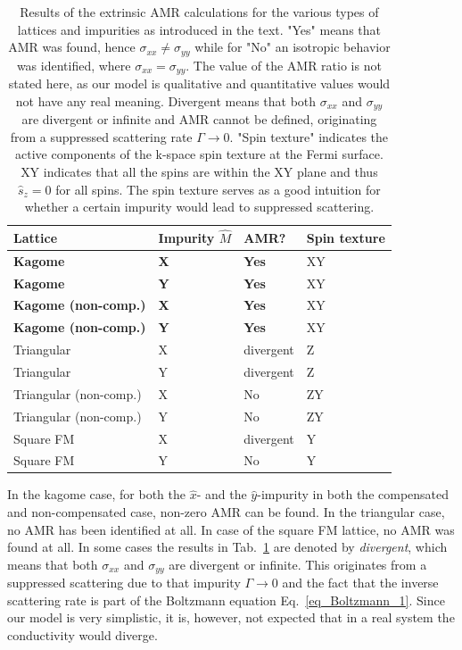 \documentclass[prb,showpacs,amsmath,amssymb,superscriptaddress,twocolumn,floatfix]{revtex4-1}
\begin{document}
\begin{table}
	\begin{tabular}{llll}
	Lattice & Impurity $\hat{M}$ & AMR? & Spin texture \\
	\hline 
	\textbf{Kagome} & \textbf{X} & \textbf{Yes} & XY\\
	\textbf{Kagome} & \textbf{Y} & \textbf{Yes} & XY \\
	\textbf{Kagome (non-comp.)} & \textbf{X} & \textbf{Yes} & XY\\
	\textbf{Kagome (non-comp.)} & \textbf{Y} & \textbf{Yes} & XY \\
	\hline 
	Triangular & X & divergent & Z \\
	Triangular & Y & divergent & Z \\
	{\color{red} Triangular (non-comp.)} & {\color{red} X} & {\color{red} No} & {\color{red} ZY} \\
    Triangular (non-comp.) & Y & No & ZY \\
	\hline
	Square FM & X & divergent & Y\\
	Square FM & Y & No & Y
\end{tabular}
\caption{Results of the extrinsic AMR calculations for the various types of lattices and impurities as introduced in the text. "Yes" means that AMR was found, hence $\sigma_{xx} \neq \sigma_{yy}$ while for "No" an isotropic behavior was identified, where $\sigma_{xx} = \sigma_{yy}$. The value of the AMR ratio is not stated here, as our model is qualitative and quantitative values would not have any real meaning. Divergent means that both $\sigma_{xx}$ and $\sigma_{yy}$ are divergent or infinite and AMR cannot be defined, originating from a suppressed scattering rate $\Gamma \rightarrow 0$. "Spin texture" indicates the active components of the k-space spin texture at the Fermi surface. XY indicates that all the spins are within the XY plane and thus $\hat{s}_z = 0$ for all spins. The spin texture serves as a good intuition for whether a certain impurity would lead to suppressed scattering.}
\label{T_extrinsic}
\end{table}

In the kagome case, for both the $\hat{x}$- and the $\hat{y}$-impurity in both the compensated and non-compensated case, non-zero AMR can be found. In the triangular case, no AMR has been identified at all. In case of the square FM lattice, no AMR was found at all. In some cases the results in Tab.~\ref{T_extrinsic} are denoted by \textit{divergent}, which means that both $\sigma_{xx}$ and $\sigma_{yy}$ are divergent or infinite. This originates from a suppressed scattering due to that impurity $\Gamma \rightarrow 0$ and the fact that the inverse scattering rate is part of the Boltzmann equation Eq.~\ref{eq_Boltzmann_1}. Since our model is very simplistic, it is, however, not expected that in a real system the conductivity would diverge.
\end{document}
